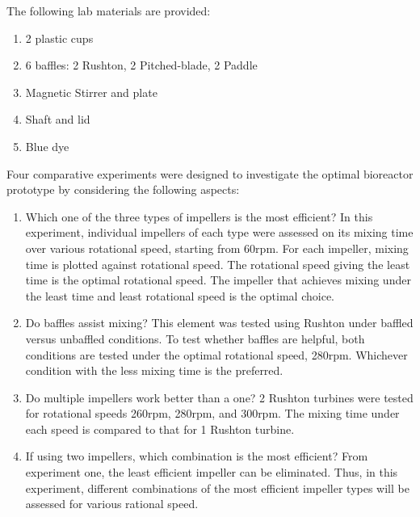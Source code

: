 The following lab materials are provided: 

\begin{enumerate}
	\item 2 plastic cups 
	\item 6 baffles: 2 Rushton, 2 Pitched-blade, 2 Paddle 
	\item Magnetic Stirrer and plate 
	\item Shaft and lid  
	\item Blue dye 
\end{enumerate}


Four comparative experiments were designed to investigate the optimal bioreactor prototype by considering the following aspects: 
\begin{enumerate}
	\item Which one of the three types of impellers is the most efficient? In this experiment, individual impellers of each type were assessed on its mixing time over various rotational speed, starting from 60rpm. For each impeller, mixing time is plotted against rotational speed. The rotational speed giving the least time is the optimal rotational speed. The impeller that achieves mixing under the least time and least rotational speed is the optimal choice.
	\item Do baffles assist mixing? This element was tested using Rushton under baffled versus unbaffled conditions. To test whether baffles are helpful, both conditions are tested under the optimal rotational speed, 280rpm. Whichever condition with the less mixing time is the preferred.
	\item Do multiple impellers work better than a one? 2 Rushton turbines were tested for rotational speeds 260rpm, 280rpm, and 300rpm. The mixing time under each speed is compared to that for 1 Rushton turbine.
	\item If using two impellers, which combination is the most efficient? From experiment one, the least efficient impeller can be eliminated. Thus, in this experiment, different combinations of the most efficient impeller types will be assessed for various rational speed.
\end{enumerate}

